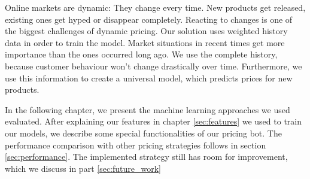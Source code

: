 Online markets are dynamic: They change every time. New products get released, existing ones get hyped or disappear completely. Reacting to changes is one of the biggest challenges of dynamic pricing. Our solution uses weighted history data in order to train the model. Market situations in recent times get more importance than the ones occurred long ago. We use the complete history, because customer behaviour won't change drastically over time. Furthermore, we use this information to create a universal model, which predicts prices for new products.

In the following chapter, we present the machine learning approaches we used evaluated. After explaining our features in chapter \ref{sec:features} we used to train our models, we describe some special functionalities of our pricing bot. The performance comparison with other pricing strategies follows in section \ref{sec:performance}. The implemented strategy still has room for improvement, which we discuss in part \ref{sec:future_work}
